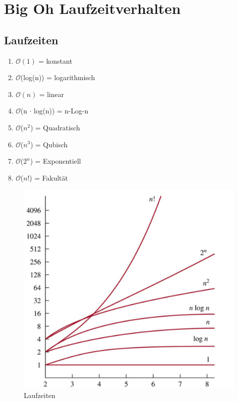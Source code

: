 


\newcommand{\SUBJECT}{Zusammenfassung}
\newcommand{\TITLE}{Algorithmen und Datenstrukturen 2}




\section{Big Oh Laufzeitverhalten}

\subsection{Laufzeiten}
\begin{enumerate}
	\item $\mathcal{O}(1)$ = konstant
	\item $\mathcal{O}$(log(n)) = logarithmisch
	\item $\mathcal{O}(n)$ = linear
	\item $\mathcal{O}$(n $\cdot$ log(n)) = n-Log-n
	\item $\mathcal{O}$($n^2$) = Quadratisch
	\item $\mathcal{O}$($n^3$) = Qubisch
	\item $\mathcal{O}$($2^n$) = Exponentiell
	\item $\mathcal{O}$($n!$) = Fakultät
\end{enumerate}

\begin{figure}[h]
	\centering
	\includegraphics[width=0.4\linewidth]{images/laufzeiten}
	\caption{Laufzeiten}
\end{figure}


